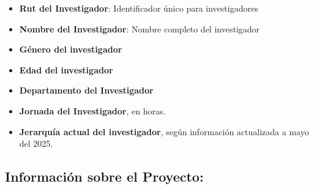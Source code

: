 \documentclass[
  spanish,
  letterpaper,
  DIV=11,
  numbers=noendperiod]{scrreprt}
\begin{document}
\begin{itemize}
\item
  \textbf{Rut del Investigador}: Identificador único para investigadores
\item
  \textbf{Nombre del Investigador}: Nombre completo del investigador
\item
  \textbf{Género del investigador}
\item
  \textbf{Edad del investigador}
\item
  \textbf{Departamento del Investigador}
\item
  \textbf{Jornada del Investigador}, en horas.
\item
  \textbf{Jerarquía actual del investigador}, según información
  actualizada a mayo del 2025.
\end{itemize}

\subsection{Información sobre el
Proyecto:}\label{informaciuxf3n-sobre-el-proyecto}
\end{document}
